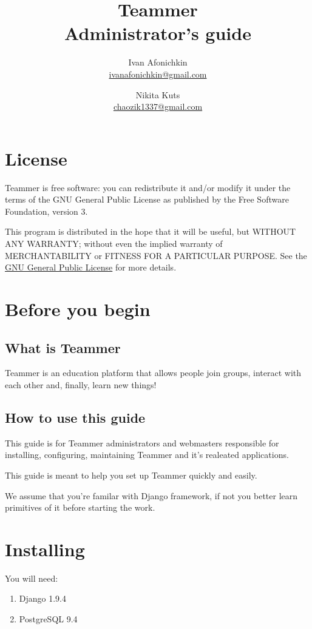 \documentclass{report}
\author{Ivan Afonichkin \\ \href{mailto:ivanafonichkin@gmail.com}{ivanafonichkin@gmail.com} 
   \and Nikita Kuts \\ \href{mailto:chaozik1337@gmail.com}{chaozik1337@gmail.com} }
\title{Teammer \\ Administrator's guide}
\begin{document}
\maketitle
\tableofcontents

\section{License}
Teammer is free software: you can redistribute it and/or modify
it under the terms of the GNU General Public License as published by
the Free Software Foundation, version 3.

This program is distributed in the hope that it will be useful, but WITHOUT ANY WARRANTY; without even the implied warranty of MERCHANTABILITY or FITNESS FOR A PARTICULAR PURPOSE.  See the \href{http://www.gnu.org/licenses/}{GNU General Public License} for more details.

\section{Before you begin}
\subsection{What is Teammer}

Teammer is an education platform that allows people join groups, interact with each other and, finally, learn new things!

\subsection{How to use this guide}
This guide is for Teammer administrators and webmasters responsible for installing, configuring, maintaining Teammer and it’s realeated applications.

This guide is meant to help you set up Teammer quickly and easily.

We assume that you’re familar with Django framework, if not you better learn primitives of it before starting the work.

\section{Installing}
You will need:

\begin{enumerate}
\item Django 1.9.4
\item PostgreSQL 9.4
\end{enumerate}
\end{document}
